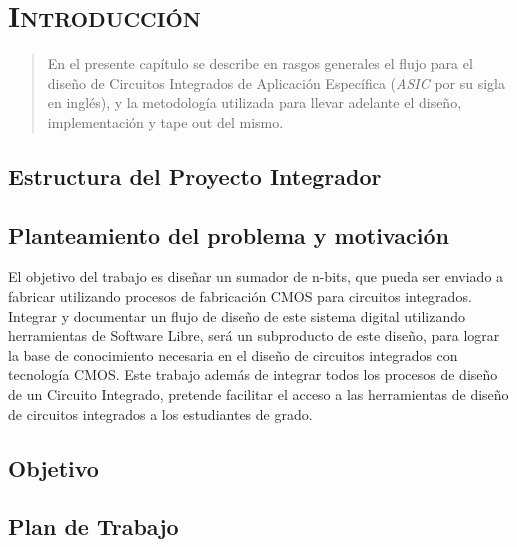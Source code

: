 \chapter{ \textsc{ Introducción } }
\begin{abstract}
En el presente capítulo se describe en rasgos generales el flujo para el diseño de Circuitos Integrados de Aplicación Específica (\emph{ASIC} por su sigla en inglés), y la metodología utilizada para llevar adelante el diseño, implementación y tape out del mismo.
\end{abstract}
\section{Estructura del Proyecto Integrador}

\section{Planteamiento del problema y motivación}
El objetivo del trabajo es diseñar un sumador de n-bits, que pueda ser enviado a fabricar utilizando
procesos de fabricación CMOS para circuitos integrados. Integrar y documentar un flujo de diseño
de este sistema digital utilizando herramientas de Software Libre, será un subproducto de este
diseño, para lograr la base de conocimiento necesaria en el diseño de circuitos integrados con
tecnología CMOS. Este trabajo además de integrar todos los procesos de diseño de un Circuito
Integrado, pretende facilitar el acceso a las herramientas de diseño de circuitos integrados a los
estudiantes de grado.

\section{Objetivo}


\section{Plan de Trabajo}

